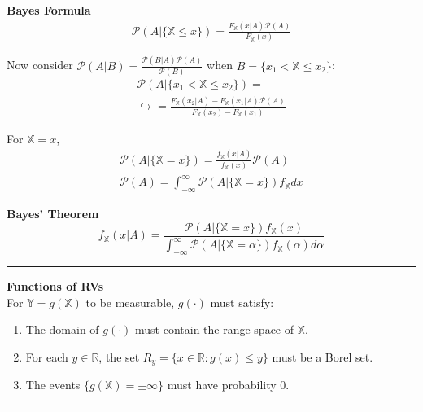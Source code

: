 \documentclass{article}
\renewcommand{\P}{\mathcal{P}}
\providecommand{\X}{\mathbb{X}}
\providecommand{\Y}{\mathbb{Y}}
\providecommand{\R}{\mathbb{R}}
\begin{document}
\begin{multicols*}{3}
        \textbf{Bayes Formula}
        \begin{equation*}
            \begin{gathered}
                \P(A|\{\X\leq x\}) = \frac{F_\X(x|A)\P(A)}{F_\X(x)}
            \end{gathered}
        \end{equation*}

        \newpage
        Now consider $\P(A|B) = \frac{\P(B|A)\P(A)}{\P(B)}$ when $B=\{x_1<\X\leq x_2\}$:
        \begin{equation*}
            \begin{gathered}
                \P(A|\{x_1<\X\leq x_2\}) = \\
                \hookrightarrow = \frac{F_\X (x_2|A) - F_\X (x_1|A)\P(A)}{F_\X(x_2) - F_\X(x_1)}
            \end{gathered}
        \end{equation*}

        For $\X=x$,
        \begin{equation*}
            \begin{gathered}
                \P(A|\{\X=x\}) = \frac{f_\X(x|A)}{f_\X(x)}\P(A)\\
                \P(A)= \int_{-\infty}^{\infty} \P(A|\{\X=x\})f_{\X}dx
            \end{gathered}
        \end{equation*}

        \textbf{Bayes' Theorem}
        \begin{equation*}
            f_{\X}(x|A) = \frac{\P(A|\{\X=x\})f_\X(x)}{\int_{-\infty}^{\infty}\P(A|\{\X=\alpha\})f_\X(\alpha)d\alpha }
        \end{equation*}

        \noindent\rule{\columnwidth}{0.4pt}

        \textbf{Functions of RVs}\\
        For $\Y=g(\X)$ to be measurable, $g(\cdot)$ must satisfy:
        \begin{enumerate}
            \item The domain of $g(\cdot)$ must contain the range space of $\X$.
            \item For each $y\in\R$, the set $R_y = \{x\in\R:g(x)\leq y\}$ must be a Borel set.
            \item The events $\{g(\X)=\pm\infty\}$ must have probability 0.
        \end{enumerate}

        \noindent\rule{\columnwidth}{0.4pt}


\end{multicols*}
\end{document}
